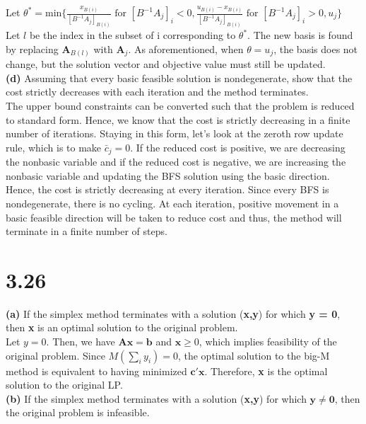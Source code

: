 \documentclass{article}
\begin{document}
\noindent
Let $\theta^* = \text{min} \{\frac{x_{B(i)}}{[B^{-1}A_j]_{B(i)}} \text{ for } [B^{-1}A_j]_i < 0, \frac{u_{B(i)} - x_{B(i)}}{[B^{-1}A_j]_{B(i)}} \text{ for } [B^{-1}A_j]_i > 0,u_j \}$\\
Let $l$ be the index in the subset of i corresponding to $\theta^*$.  The new basis is found by replacing $\mathbf{A}_{B(l)}$ with $\mathbf{A}_j$.  As aforementioned, when $\theta = u_j$, the basis does not change, but the solution vector and objective value must still be updated.\\

\noindent
\textbf{(d)} Assuming that every basic feasible solution is nondegenerate, show that the cost strictly decreases with each iteration and the method terminates.\\

\noindent
The upper bound constraints can be converted such that the problem is reduced to standard form.  Hence, we know that the cost is strictly decreasing in a finite number of iterations.  Staying in this form, let's look at the zeroth row update rule, which is to make $\bar{c}_j = 0$.  If the reduced cost is positive, we are decreasing the nonbasic variable and if the reduced cost is negative, we are increasing the nonbasic variable and updating the BFS solution using the basic direction.  Hence, the cost is strictly decreasing at every iteration.  Since every BFS is nondegenerate, there is no cycling.  At each iteration, positive movement in a basic feasible direction will be taken to reduce cost and thus, the method will terminate in a finite number of steps.


\section*{3.26}
\noindent
\textbf{(a)}  If the simplex method terminates with a solution (\textbf{x,y}) for which \textbf{y = 0}, then \textbf{x} is an optimal solution to the original problem.\\

\noindent
Let $y = 0.$  Then, we have $\mathbf{Ax=b}$ and $\mathbf{x} \geq 0$, which implies feasibility of the original problem.  Since $M(\displaystyle \sum_i y_i)=0$, the optimal solution to the big-M method is equivalent to having minimized  $\mathbf{c'x}$.  Therefore, \textbf{x} is the optimal solution to the original LP.\\

\noindent
\textbf{(b)}  If the simplex method terminates with a solution (\textbf{x,y}) for which $\mathbf{y \neq 0}$, then the original problem is infeasible.\\
\end{document}
